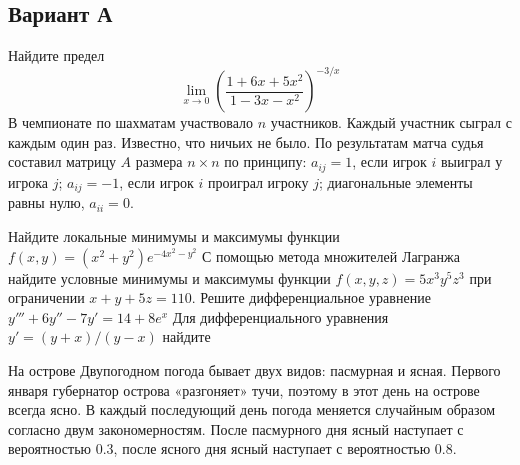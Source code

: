 \documentclass[addpoints, answers]{exam} %
\begin{document}
\subsection{Вариант А}
\begin{questions}
\question  Найдите предел 
\[
\lim_{x\to 0} \left(\frac{1+6x+5x^2}{1-3x-x^2} \right)^{-3/x}
\]
\question В чемпионате по шахматам участвовало $n$ участников. Каждый участник сыграл с каждым один раз. Известно, что ничьих не было. По результатам матча судья составил матрицу $A$ размера $n\times n$ по принципу: $a_{ij}=1$, если игрок $i$ выиграл у игрока $j$; $a_{ij}=-1$, если игрок $i$ проиграл игроку $j$; диагональные элементы равны нулю, $a_{ii}=0$.
\question Найдите локальные минимумы и максимумы функции $f(x,y)=(x^2+y^2)e^{-4x^2-y^2}$
\question С помощью метода множителей Лагранжа найдите условные минимумы и максимумы функции $f(x,y,z)=5x^3y^5z^3$ при ограничении $x+y+5z=110$.
\question Решите дифференциальное уравнение $y'''+6y''-7y'=14+8e^{x}$
\question Для дифференциального уравнения $y'=(y+x)/(y-x)$ найдите
\question На острове Двупогодном погода бывает двух видов: пасмурная и ясная. Первого января губернатор острова «разгоняет»  тучи, поэтому в этот день на острове всегда ясно. В каждый последующий день погода меняется случайным образом согласно двум закономерностям. После пасмурного дня ясный наступает с  вероятностью 0.3, после ясного дня ясный наступает с вероятностью 0.8. 
\begin{parts}

\end{parts}
\end{questions}
\end{document}
